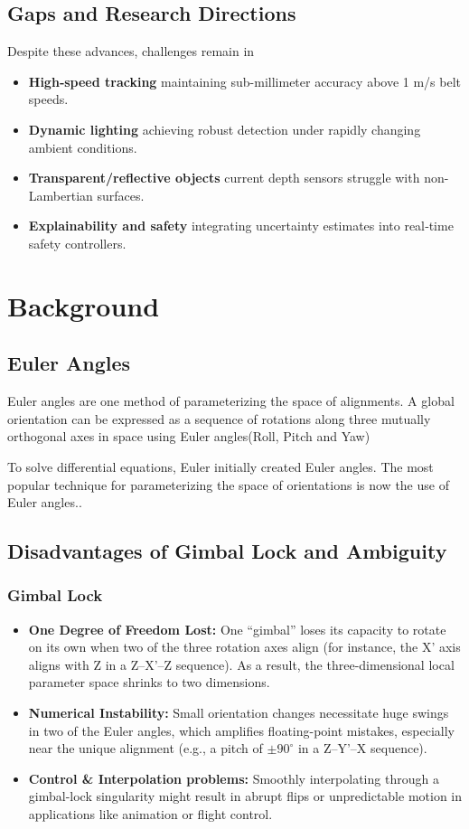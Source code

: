 \documentclass[12pt]{article}
\begin{document}
\subsection{Gaps and Research Directions}
Despite these advances, challenges remain in  
\begin{itemize}[nosep]
  \item \textbf{High‐speed tracking} maintaining sub-millimeter accuracy above 1 m/s belt speeds.
  \item \textbf{Dynamic lighting} achieving robust detection under rapidly changing ambient conditions.
  \item \textbf{Transparent/reflective objects} current depth sensors struggle with non-Lambertian surfaces.
  \item \textbf{Explainability and safety} integrating uncertainty estimates into real‐time safety controllers.
\end{itemize}


\newpage
\section{Background}
\subsection{Euler Angles}
Euler angles are one method of parameterizing the space of alignments.  A global orientation can be expressed as a sequence of rotations along three mutually orthogonal axes in space using Euler angles(Roll, Pitch and Yaw)

To solve differential equations, Euler initially created Euler angles. The most popular technique for parameterizing the space of orientations is now the use of Euler angles.\cite{ref20}.

\subsection{Disadvantages of Gimbal Lock and Ambiguity}
\subsubsection{Gimbal Lock}
\begin{itemize}
  \item \textbf{One Degree of Freedom Lost:} 
   One ``gimbal'' loses its capacity to rotate on its own when two of the three rotation axes align (for instance, the X' axis aligns with Z in a Z–X'–Z sequence).  As a result, the three-dimensional local parameter space shrinks to two dimensions\cite{ref20}.
  \item \textbf{Numerical Instability:} 
    Small orientation changes necessitate huge swings in two of the Euler angles, which amplifies floating-point mistakes, especially near the unique alignment (e.g., a pitch of $\pm90^\circ$ in a Z–Y'–X sequence)\cite{ref20}.
  \item \textbf{Control \& Interpolation problems:} 
    Smoothly interpolating through a gimbal-lock singularity might result in abrupt flips or unpredictable motion in applications like animation or flight control\cite{ref20}.
\end{itemize}
\end{document}
